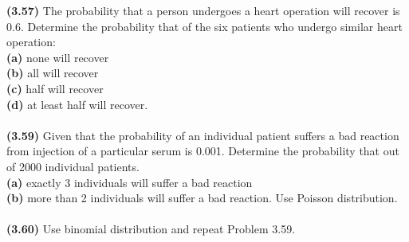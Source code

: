 \documentclass[11pt]{article}
\renewcommand\part[1]{\vspace{.10in}\textbf{(#1)}}
\begin{document}
\part{3.57} The probability that a person undergoes a heart operation will recover is 0.6. Determine the probability that of the six patients who undergo similar heart operation: \\

\part{a} none will recover \\
\part{b} all will recover \\
\part{c} half will recover \\
\part{d} at least half will recover. \\ \ \\

\part{3.59} Given that the probability of an individual patient suffers a bad reaction from injection of a particular serum is 0.001. Determine the probability that out of 2000 individual patients. \\

\part{a} exactly 3 individuals will suffer a bad reaction \\
\part{b} more than 2 individuals will suffer a bad reaction. Use Poisson distribution. \\ \ \\

\part{3.60} Use binomial distribution and repeat Problem 3.59. \\
\end{document}
